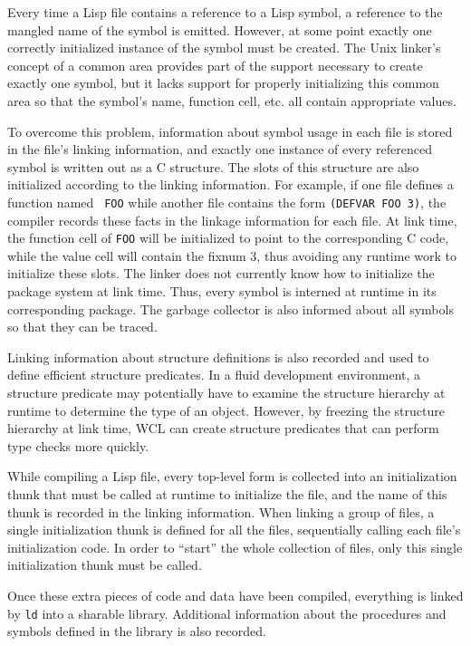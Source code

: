 Every time a Lisp file contains a reference to a Lisp symbol, a
reference to the mangled name of the symbol is emitted. However, at
some point exactly one correctly initialized instance of the symbol
must be created. The Unix linker's concept of a common area provides part
of the support necessary to create exactly one symbol, but it lacks
support for properly initializing this common area so that the
symbol's name, function cell, etc.  all contain appropriate values.

To overcome this problem, information about symbol usage in each file
is stored in the file's linking information, and exactly one instance
of every referenced symbol is written out as a C structure.  The slots
of this structure are also initialized according to the linking
information. For example, if one file defines a function named {\tt
FOO} while another file contains the form {\tt (DEFVAR FOO 3)}, the
compiler records these facts in the linkage information for each file.
At link time, the function cell of {\tt FOO} will be initialized to
point to the corresponding C code, while the value cell will contain
the fixnum 3, thus avoiding any runtime work to initialize these
slots.  The linker does not currently know how to initialize the
package system at link time. Thus, every symbol is interned at runtime
in its corresponding package. The garbage collector is also informed
about all symbols so that they can be traced.

Linking information about structure definitions is also recorded and
used to define efficient structure predicates. In a fluid development
environment, a structure predicate may potentially have to examine the
structure hierarchy at runtime to determine the type of an object.
However, by freezing the structure hierarchy at link time, WCL can
create structure predicates that can perform type checks more quickly.

While compiling a Lisp file, every top-level form is collected
into an initialization thunk that must be called at runtime
to initialize the file, and the name of this thunk is recorded in
the linking information. When linking a group of files, a single
initialization thunk is defined for all the files, sequentially calling
each file's initialization code. In order to ``start'' the whole collection
of files, only this single initialization thunk must be called.

Once these extra pieces of code and data have been compiled,
everything is linked by {\tt ld} into a sharable library.
Additional information about the procedures and symbols defined in the
library is also recorded.

